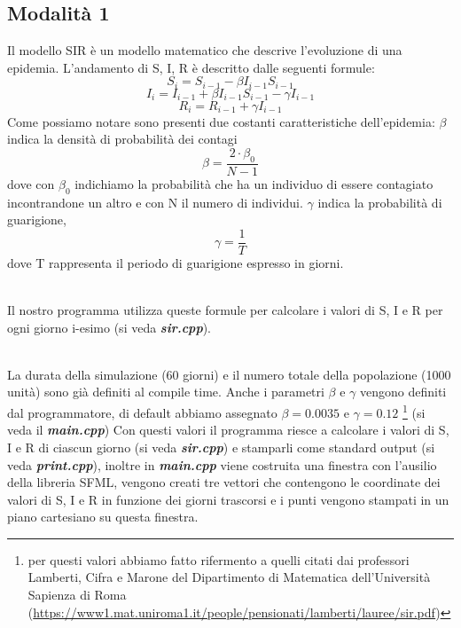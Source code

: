 \documentclass[a4paper,10 pt]{article}
\begin{document}
\subsection{Modalità 1}
Il modello SIR è un modello matematico che descrive l'evoluzione di una epidemia. L'andamento di S, I, R è descritto dalle seguenti formule:
\begin{equation}
  S_i = S_{i - 1} - \beta I_{i - 1}S_{i - 1} 
\end{equation}
\begin{equation}
  I_i = I_{i - 1} + \beta I_{i - 1}S_{i - 1} - \gamma I_{i - 1}
\end{equation}
\begin{equation}
  R_i = R_{i - 1} + \gamma I_{i - 1}
\end{equation} Come possiamo notare sono presenti due costanti caratteristiche dell'epidemia: $\beta$ indica la densità di probabilità dei contagi 
\begin{equation}
  \beta = \frac{2\cdot \beta_0}{N-1}
\end{equation}
dove con $\beta_0$ indichiamo la probabilità che ha un individuo di essere contagiato incontrandone un altro e con N il numero di individui. 
$\gamma$ indica la probabilità di guarigione, 
\begin{equation}
  \gamma = \frac{1}{T}
\end{equation} dove T rappresenta il periodo di guarigione espresso in giorni.

\ 
\\
Il nostro programma utilizza queste formule per calcolare i valori di S, I e R per ogni giorno i-esimo (si veda  \textbf{\textit{sir.cpp}}).

\ 
\\
La durata della simulazione (60 giorni) e il numero totale della popolazione (1000 unità) sono già definiti al compile time. Anche i parametri $\beta$ e $\gamma$ vengono definiti dal programmatore, di default abbiamo assegnato $\beta = 0.0035$ e $\gamma = 0.12$ \footnote{per questi valori abbiamo fatto rifermento a quelli citati dai professori Lamberti, Cifra e Marone del Dipartimento di Matematica dell'Università Sapienza di Roma (\url{https://www1.mat.uniroma1.it/people/pensionati/lamberti/lauree/sir.pdf})} (si veda il \textbf{\textit{main.cpp}})
Con questi valori il programma riesce a calcolare i valori di S, I e R di ciascun giorno (si veda  \textbf{\textit{sir.cpp}}) e stamparli come standard output (si veda  \textbf{\textit{print.cpp}}), inoltre in \textbf{\textit{main.cpp}} viene costruita una finestra con l'ausilio della libreria SFML, vengono creati tre vettori che contengono le coordinate dei valori di S, I e R in funzione dei giorni trascorsi e i punti vengono stampati in un piano cartesiano su questa finestra.
\end{document}
